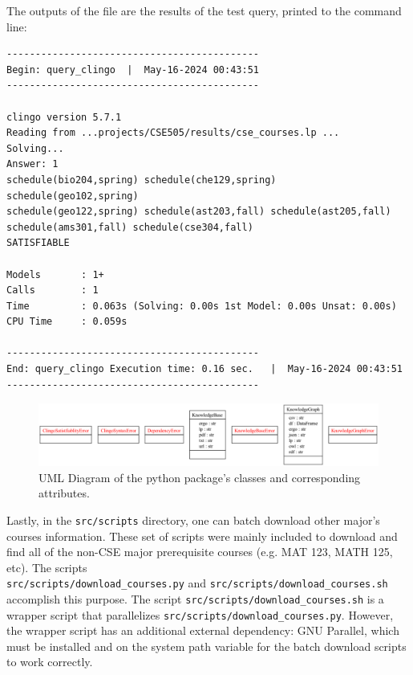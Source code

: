 \documentclass[12pt]{article}
\begin{document}
    \newpage 
    
    The outputs of the file are the results of the test query, printed to the command line: \\

    \begin{verbatim}
--------------------------------------------
Begin: query_clingo  |  May-16-2024 00:43:51
--------------------------------------------

clingo version 5.7.1
Reading from ...projects/CSE505/results/cse_courses.lp ...
Solving...
Answer: 1
schedule(bio204,spring) schedule(che129,spring) schedule(geo102,spring) 
schedule(geo122,spring) schedule(ast203,fall) schedule(ast205,fall) 
schedule(ams301,fall) schedule(cse304,fall)
SATISFIABLE

Models       : 1+
Calls        : 1
Time         : 0.063s (Solving: 0.00s 1st Model: 0.00s Unsat: 0.00s)
CPU Time     : 0.059s

--------------------------------------------
End: query_clingo Execution time: 0.16 sec.   |  May-16-2024 00:43:51
--------------------------------------------
    \end{verbatim}

    \begin{figure}[h!]
        \centering
        \includegraphics[scale=0.4]{figures/uml/classes_src.png}
        \caption{UML Diagram of the python package's classes and corresponding attributes.}
        \label{fig:uml-classes}
    \end{figure}

    Lastly, in the {\tt{src/scripts}} directory, one can batch download other major's courses information. These set of scripts were mainly included to download and find all of the non-CSE major prerequisite courses (e.g. MAT 123, MATH 125, etc). The scripts \\ {\tt{src/scripts/download\_courses.py}} and {\tt{src/scripts/download\_courses.sh}} accomplish this purpose. The script {\tt{src/scripts/download\_courses.sh}} is a wrapper script that parallelizes {\tt{src/scripts/download\_courses.py}}. However, the wrapper script has an additional external dependency: GNU Parallel\cite{parallel2018}, which must be installed and on the system path variable for the batch download scripts to work correctly.
\end{document}
